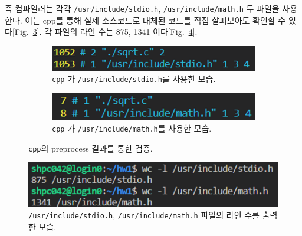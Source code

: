 \begin{enumerate}[label= (\alph*)]
{        즉 컴파일러는 각각 \texttt{/usr/include/stdio.h}, \texttt{/usr/include/math.h} 두 파일을 사용한다.
        이는 cpp를 통해 실제 소스코드로 대체된 코드를 직접 살펴보아도 확인할 수 있다[Fig.~\ref{fig:included}].
        각 파일의 라인 수는 875, 1341 이다[Fig.~\ref{fig:1-1_linenum}].

        \begin{figure}
            \centering
            \begin{subfigure}[b]{0.48\textwidth}
                \centering
                \includegraphics[width=\textwidth]{imgs/Figure00_stdio.png}
                \caption{\texttt{cpp} 가 \texttt{/usr/include/stdio.h}를 사용한 모습.}
                \label{fig:stdio_included}
            \end{subfigure}
            \hfill
            \begin{subfigure}[b]{0.48\textwidth}
                \centering
                \includegraphics[width=\textwidth]{imgs/Figure00_math.png}
                \caption{\texttt{cpp} 가 \texttt{/usr/include/math.h}를 사용한 모습.}
                \label{fig:math_included}
            \end{subfigure}
            \caption{
                \texttt{cpp}의 preprocess 결과를 통한 검증.
            }
            \label{fig:included}
        \end{figure}
        
        \begin{figure}
            \centering
            \includegraphics[scale=0.66]{imgs/Figure01_real.png}
            \caption{\label{fig:1-1_linenum}
                \texttt{/usr/include/stdio.h}, \texttt{/usr/include/math.h}
                파일의 라인 수를 출력한 모습.
            }
        \end{figure}
    }


\end{enumerate}
